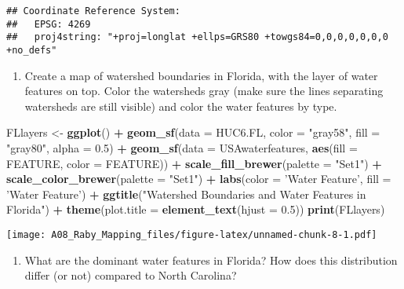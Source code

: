 \documentclass[]{article}
\newenvironment{Shaded}{\begin{snugshade}}{\end{snugshade}}
\newcommand{\DataTypeTok}[1]{\textcolor[rgb]{0.13,0.29,0.53}{#1}}
\newcommand{\FloatTok}[1]{\textcolor[rgb]{0.00,0.00,0.81}{#1}}
\newcommand{\KeywordTok}[1]{\textcolor[rgb]{0.13,0.29,0.53}{\textbf{#1}}}
\newcommand{\NormalTok}[1]{#1}
\newcommand{\OperatorTok}[1]{\textcolor[rgb]{0.81,0.36,0.00}{\textbf{#1}}}
\newcommand{\StringTok}[1]{\textcolor[rgb]{0.31,0.60,0.02}{#1}}
\providecommand{\tightlist}{%
  \setlength{\itemsep}{0pt}\setlength{\parskip}{0pt}}
\begin{document}
\begin{verbatim}
## Coordinate Reference System:
##   EPSG: 4269 
##   proj4string: "+proj=longlat +ellps=GRS80 +towgs84=0,0,0,0,0,0,0 +no_defs"
\end{verbatim}

\begin{enumerate}
\def\labelenumi{\arabic{enumi}.}
\setcounter{enumi}{10}
\tightlist
\item
  Create a map of watershed boundaries in Florida, with the layer of
  water features on top. Color the watersheds gray (make sure the lines
  separating watersheds are still visible) and color the water features
  by type.
\end{enumerate}

\begin{Shaded}
\begin{Highlighting}[]
\NormalTok{FLlayers <-}\StringTok{ }\KeywordTok{ggplot}\NormalTok{() }\OperatorTok{+}
\StringTok{  }\KeywordTok{geom_sf}\NormalTok{(}\DataTypeTok{data =}\NormalTok{ HUC6.FL, }\DataTypeTok{color =} \StringTok{"gray58"}\NormalTok{, }\DataTypeTok{fill =} \StringTok{"gray80"}\NormalTok{, }\DataTypeTok{alpha =} \FloatTok{0.5}\NormalTok{) }\OperatorTok{+}
\StringTok{  }\KeywordTok{geom_sf}\NormalTok{(}\DataTypeTok{data =}\NormalTok{ USAwaterfeatures, }\KeywordTok{aes}\NormalTok{(}\DataTypeTok{fill =}\NormalTok{ FEATURE, }\DataTypeTok{color =}\NormalTok{ FEATURE)) }\OperatorTok{+}
\StringTok{  }\KeywordTok{scale_fill_brewer}\NormalTok{(}\DataTypeTok{palette =} \StringTok{"Set1"}\NormalTok{) }\OperatorTok{+}
\StringTok{  }\KeywordTok{scale_color_brewer}\NormalTok{(}\DataTypeTok{palette =} \StringTok{"Set1"}\NormalTok{) }\OperatorTok{+}
\StringTok{  }\KeywordTok{labs}\NormalTok{(}\DataTypeTok{color =} \StringTok{'Water Feature'}\NormalTok{, }\DataTypeTok{fill =} \StringTok{'Water Feature'}\NormalTok{) }\OperatorTok{+}
\StringTok{  }\KeywordTok{ggtitle}\NormalTok{(}\StringTok{"Watershed Boundaries and Water Features in Florida"}\NormalTok{) }\OperatorTok{+}
\StringTok{  }\KeywordTok{theme}\NormalTok{(}\DataTypeTok{plot.title =} \KeywordTok{element_text}\NormalTok{(}\DataTypeTok{hjust =} \FloatTok{0.5}\NormalTok{))}
\KeywordTok{print}\NormalTok{(FLlayers)}
\end{Highlighting}
\end{Shaded}

\texttt{[image: A08\_Raby\_Mapping\_files/figure-latex/unnamed-chunk-8-1.pdf]}

\begin{enumerate}
\def\labelenumi{\arabic{enumi}.}
\setcounter{enumi}{11}
\tightlist
\item
  What are the dominant water features in Florida? How does this
  distribution differ (or not) compared to North Carolina?
\end{enumerate}
\end{document}
